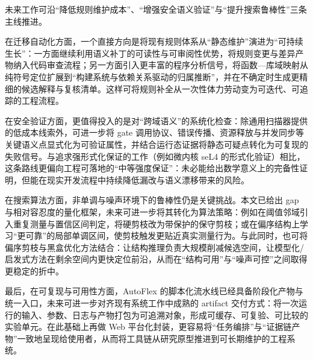 \documentclass[UTF8,a4paper,12pt,twoside]{ctexart}  %
\begin{document}
未来工作可沿``降低规则维护成本''、``增强安全语义验证''与``提升搜索鲁棒性''三条主线推进。

在迁移自动化方面，一个直接方向是将现有规则体系从``静态维护''演进为``可持续生长''：一方面继续利用语义补丁的可读性与可审阅性优势\cite{10,26}，将规则变更与差异产物纳入代码审查流程；另一方面引入更丰富的程序分析信号，将函数—库域映射从纯符号定位扩展到``构建系统与依赖关系驱动的归属推断''，并在不确定时生成更精细的候选解释与复核清单。这样可将规则补全从一次性体力劳动变为可迭代、可追踪的工程流程。

在安全验证方面，更值得投入的是对``跨域语义''的系统化检查：除通用扫描器\cite{11,12,13}提供的低成本线索外，可进一步将 gate 调用协议、错误传播、资源释放与并发同步等关键语义点显式化为可验证属性，并结合运行态证据将静态可疑点转化为可复现的失败信号。与追求强形式化保证的工作（例如微内核 seL4 的形式化验证\cite{20}）相比，这条路线更偏向工程可落地的``中等强度保证''：未必能给出数学意义上的完备性证明，但能在现实开发流程中持续降低漏改与语义漂移带来的风险。

在搜索算法方面，非单调与噪声环境下的鲁棒性仍是关键挑战。本文已给出 gap 与相对容忍度的量化框架，未来可进一步将其转化为算法策略：例如在阈值邻域引入重复测量与置信区间判定，将硬剪枝改为带保护的保守剪枝；或在偏序结构上学习``更可靠''的局部单调区间，使剪枝触发更贴近真实测量行为。与此同时，也可将偏序剪枝与黑盒优化方法\cite{24,25}结合：让结构推理负责大规模削减候选空间，让模型化/启发式方法在剩余空间内更快定位前沿，从而在``结构可用''与``噪声可控''之间取得更稳定的折中。

最后，在可复现与可用性方面，AutoFlex 的脚本化流水线已经具备阶段化产物与统一入口，未来可进一步对齐现有系统工作中成熟的 artifact 交付方式\cite{2}：将一次运行的输入、参数、日志与产物打包为可追溯对象，形成可缓存、可复验、可比较的实验单元。在此基础上再做 Web 平台化封装，更容易将``任务编排''与``证据链产物''一致地呈现给使用者，从而将工具链从研究原型推进到可长期维护的工程系统。


\cleardoublepage
{}

{}
\renewcommand\refname{参考文献}



\end{document}
